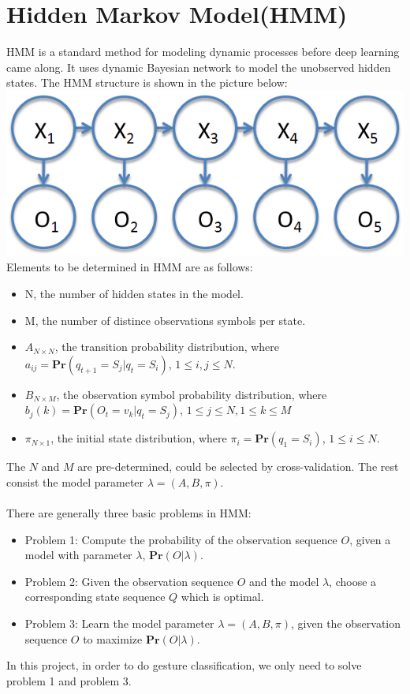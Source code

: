 \documentclass[english]{article}
\begin{document}
\section {Hidden Markov Model(HMM)}
HMM is a standard method for modeling dynamic processes before deep learning came along. It uses dynamic Bayesian network to model the unobserved hidden states. The HMM structure is shown in the picture below:\\
\includegraphics[scale=0.5]{images/hmm.png}\\
Elements to be determined in HMM are as follows:\\
\begin{itemize}
\item N, the number of hidden states in the model.
\item M, the number of distince observations symbols per state.
\item $A_{N\times N}$, the transition probability distribution, where $a_{ij} = \mathbf{Pr}(q_{t+1} =S_j|q_{t} = S_i)$, $1 \leq i, j \leq N$.
\item $B_{N\times M}$, the observation symbol probability distribution, where $b_j(k) = \mathbf{Pr}(O_t = v_k|q_t = S_j)$, $1\leq j\leq N, 1\leq k\leq M$
\item $\pi_{N\times 1}$, the initial state distribution, where $\pi_i = \mathbf{Pr}(q_1 = S_i)$, $1 \leq i \leq N$.
\end{itemize}
The $N$ and $M$ are pre-determined, could be selected by cross-validation. The rest consist the model parameter $\lambda = (A, B, \pi)$.\\\\
There are generally three basic problems in HMM: \\
\begin{itemize}
\item Problem 1: Compute the probability of the observation sequence $O$, given a model with parameter $\lambda $, $\mathbf{Pr}(O|\lambda)$.
\item Problem 2: Given the observation sequence $O$ and the model $\lambda$, choose a corresponding state sequence $Q$ which is optimal. 
\item Problem 3: Learn the model parameter $\lambda = (A,B,\pi)$, given the observation sequence $O$ to maximize $\mathbf{Pr}(O|\lambda)$.
\end{itemize}
In this project, in order to do gesture classification, we only need to solve problem 1 and problem 3.\\
\end{document}
